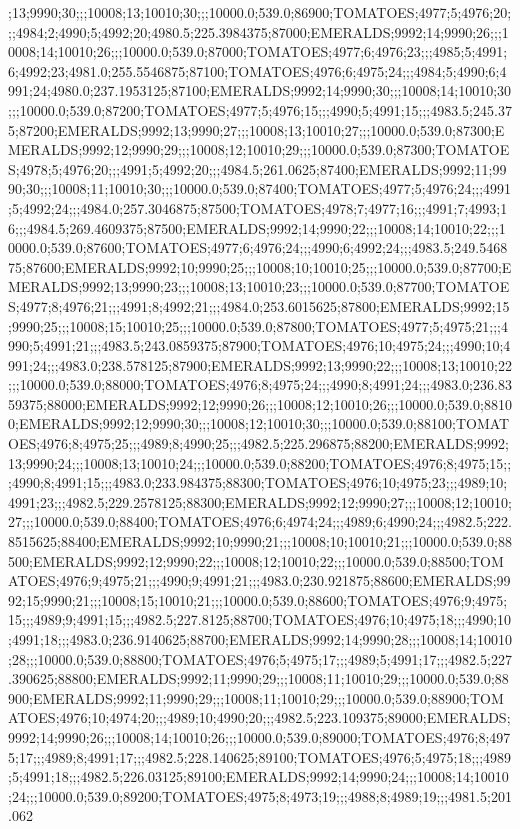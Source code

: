;13;9990;30;;;10008;13;10010;30;;;10000.0;539.0;86900;TOMATOES;4977;5;4976;20;;;4984;2;4990;5;4992;20;4980.5;225.3984375;87000;EMERALDS;9992;14;9990;26;;;10008;14;10010;26;;;10000.0;539.0;87000;TOMATOES;4977;6;4976;23;;;4985;5;4991;6;4992;23;4981.0;255.5546875;87100;TOMATOES;4976;6;4975;24;;;4984;5;4990;6;4991;24;4980.0;237.1953125;87100;EMERALDS;9992;14;9990;30;;;10008;14;10010;30;;;10000.0;539.0;87200;TOMATOES;4977;5;4976;15;;;4990;5;4991;15;;;4983.5;245.375;87200;EMERALDS;9992;13;9990;27;;;10008;13;10010;27;;;10000.0;539.0;87300;EMERALDS;9992;12;9990;29;;;10008;12;10010;29;;;10000.0;539.0;87300;TOMATOES;4978;5;4976;20;;;4991;5;4992;20;;;4984.5;261.0625;87400;EMERALDS;9992;11;9990;30;;;10008;11;10010;30;;;10000.0;539.0;87400;TOMATOES;4977;5;4976;24;;;4991;5;4992;24;;;4984.0;257.3046875;87500;TOMATOES;4978;7;4977;16;;;4991;7;4993;16;;;4984.5;269.4609375;87500;EMERALDS;9992;14;9990;22;;;10008;14;10010;22;;;10000.0;539.0;87600;TOMATOES;4977;6;4976;24;;;4990;6;4992;24;;;4983.5;249.546875;87600;EMERALDS;9992;10;9990;25;;;10008;10;10010;25;;;10000.0;539.0;87700;EMERALDS;9992;13;9990;23;;;10008;13;10010;23;;;10000.0;539.0;87700;TOMATOES;4977;8;4976;21;;;4991;8;4992;21;;;4984.0;253.6015625;87800;EMERALDS;9992;15;9990;25;;;10008;15;10010;25;;;10000.0;539.0;87800;TOMATOES;4977;5;4975;21;;;4990;5;4991;21;;;4983.5;243.0859375;87900;TOMATOES;4976;10;4975;24;;;4990;10;4991;24;;;4983.0;238.578125;87900;EMERALDS;9992;13;9990;22;;;10008;13;10010;22;;;10000.0;539.0;88000;TOMATOES;4976;8;4975;24;;;4990;8;4991;24;;;4983.0;236.8359375;88000;EMERALDS;9992;12;9990;26;;;10008;12;10010;26;;;10000.0;539.0;88100;EMERALDS;9992;12;9990;30;;;10008;12;10010;30;;;10000.0;539.0;88100;TOMATOES;4976;8;4975;25;;;4989;8;4990;25;;;4982.5;225.296875;88200;EMERALDS;9992;13;9990;24;;;10008;13;10010;24;;;10000.0;539.0;88200;TOMATOES;4976;8;4975;15;;;4990;8;4991;15;;;4983.0;233.984375;88300;TOMATOES;4976;10;4975;23;;;4989;10;4991;23;;;4982.5;229.2578125;88300;EMERALDS;9992;12;9990;27;;;10008;12;10010;27;;;10000.0;539.0;88400;TOMATOES;4976;6;4974;24;;;4989;6;4990;24;;;4982.5;222.8515625;88400;EMERALDS;9992;10;9990;21;;;10008;10;10010;21;;;10000.0;539.0;88500;EMERALDS;9992;12;9990;22;;;10008;12;10010;22;;;10000.0;539.0;88500;TOMATOES;4976;9;4975;21;;;4990;9;4991;21;;;4983.0;230.921875;88600;EMERALDS;9992;15;9990;21;;;10008;15;10010;21;;;10000.0;539.0;88600;TOMATOES;4976;9;4975;15;;;4989;9;4991;15;;;4982.5;227.8125;88700;TOMATOES;4976;10;4975;18;;;4990;10;4991;18;;;4983.0;236.9140625;88700;EMERALDS;9992;14;9990;28;;;10008;14;10010;28;;;10000.0;539.0;88800;TOMATOES;4976;5;4975;17;;;4989;5;4991;17;;;4982.5;227.390625;88800;EMERALDS;9992;11;9990;29;;;10008;11;10010;29;;;10000.0;539.0;88900;EMERALDS;9992;11;9990;29;;;10008;11;10010;29;;;10000.0;539.0;88900;TOMATOES;4976;10;4974;20;;;4989;10;4990;20;;;4982.5;223.109375;89000;EMERALDS;9992;14;9990;26;;;10008;14;10010;26;;;10000.0;539.0;89000;TOMATOES;4976;8;4975;17;;;4989;8;4991;17;;;4982.5;228.140625;89100;TOMATOES;4976;5;4975;18;;;4989;5;4991;18;;;4982.5;226.03125;89100;EMERALDS;9992;14;9990;24;;;10008;14;10010;24;;;10000.0;539.0;89200;TOMATOES;4975;8;4973;19;;;4988;8;4989;19;;;4981.5;201.062